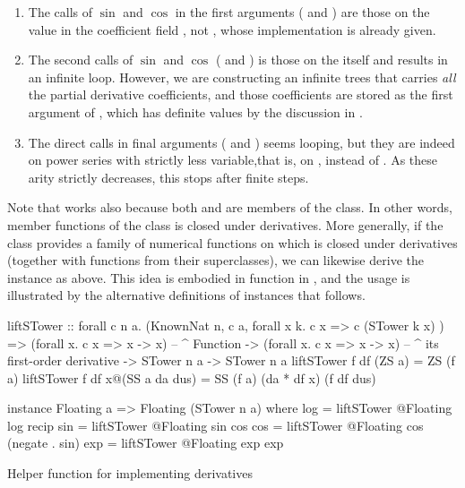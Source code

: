 \documentclass[./rims-smooth-paper.tex]{subfiles}
\begin{document}
\begin{enumerate}
\item The calls of $\sin$ and $\cos$ in the first arguments ( and ) are those on the value  in the coefficient field , not , whose implementation is already given.
\label{itm:call-coeff}
\item The second calls of $\sin$ and $\cos$ ( and ) is those on the  itself and results in an infinite loop.
However, we are constructing an infinite trees that carries \emph{all} the partial derivative coefficients, and those coefficients are stored as the first argument of , which has definite values by the discussion in .
\label{itm:call-deriv}
\item The direct calls in final arguments ( and ) seems looping, but they are indeed on power series with strictly less variable,that is, on , instead of .
As these arity strictly decreases, this stops after finite steps.
\label{itm:rec-decr}
\end{enumerate}
Note that  works also because both  and  are members of the  class.
In other words, member functions of the  class is closed under derivatives.
More generally, if the class  provides a family of numerical functions on  which is closed under derivatives (together with functions from their superclasses), we can likewise derive the instance  as above.
This idea is embodied in  function in , and the usage is illustrated by the alternative definitions of instances that follows.

\begin{listing}[tbp]
\begin{code}
liftSTower
  :: forall c n a. (KnownNat n, c a, forall x k. c x => c (STower k x) )
  => (forall x. c x => x -> x)
      -- ^ Function
  -> (forall x. c x => x -> x)
      -- ^ its first-order derivative
  -> STower n a
  -> STower n a
liftSTower f df (ZS a) = ZS (f a)
liftSTower f df x@(SS a da dus) = SS (f a) (da * df x) (f df dus)

instance Floating a => Floating (STower n a) where
  log = liftSTower @Floating log recip
  sin = liftSTower @Floating sin cos
  cos = liftSTower @Floating cos (negate . sin)
  exp = liftSTower @Floating exp exp
\end{code}
\caption{Helper function for implementing derivatives\label{lst:lift}}
\end{listing}
\end{document}
